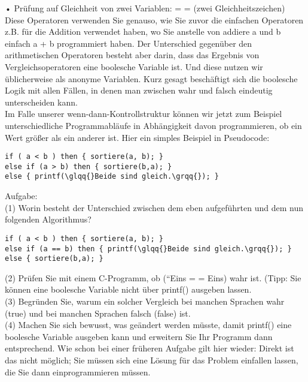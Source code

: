 •	Prüfung auf Gleichheit von zwei Variablen: = = (zwei Gleichheitszeichen)\\

Diese Operatoren verwenden Sie genauso, wie Sie zuvor die einfachen Operatoren z.B. für die Addition verwendet haben, wo Sie anstelle von addiere a und b einfach a + b programmiert haben. Der Unterschied gegenüber den arithmetischen Operatoren besteht aber darin, dass das Ergebnis von Vergleichsoperatoren eine boolesche Variable ist. Und diese nutzen wir üblicherweise als anonyme Variablen. Kurz gesagt beschäftigt sich die boolesche Logik mit allen Fällen, in denen man zwischen wahr und falsch eindeutig unterscheiden kann.\\

Im Falle unserer wenn-dann-Kontrollstruktur können wir jetzt zum Beispiel unterschiedliche Programmabläufe in Abhängigkeit davon programmieren, ob ein Wert größer als ein anderer ist. Hier ein simples Beispiel in Pseudocode:\\

\begin{verbatim}
if ( a < b ) then { sortiere(a, b); }
else if (a > b) then { sortiere(b,a); }
else { printf(\glqq{}Beide sind gleich.\grqq{}); }
\end{verbatim}

Aufgabe:\\

(1)	Worin besteht der Unterschied zwischen dem eben aufgeführten und dem nun folgenden Algorithmus?

\begin{verbatim}
if ( a < b ) then { sortiere(a, b); }
else if (a == b) then { printf(\glqq{}Beide sind gleich.\grqq{}); }
else { sortiere(b,a); }
\end{verbatim}

(2)	Prüfen Sie mit einem C-Programm, ob (``Eins\grqq{} = = \glqq{}Eins\grqq{}) wahr ist. (Tipp: Sie können eine boolesche Variable nicht über printf() ausgeben lassen.\\

(3)	Begründen Sie, warum ein solcher Vergleich bei manchen Sprachen wahr (true) und bei manchen Sprachen falsch (false) ist.\\

(4)	Machen Sie sich bewusst, was geändert werden müsste, damit printf() eine boolesche Variable ausgeben kann und erweitern Sie Ihr Programm dann entsprechend. Wie schon bei einer früheren Aufgabe gilt hier wieder: Direkt ist das nicht möglich; Sie müssen sich eine Lösung für das Problem einfallen lassen, die Sie dann einprogrammieren müssen.\\

